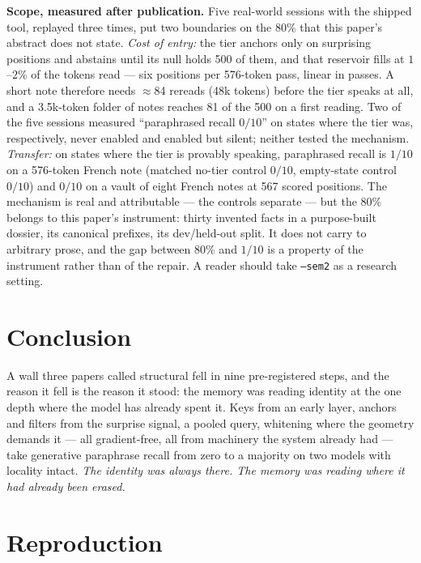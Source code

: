 \documentclass[11pt]{article}
\begin{document}
\textbf{Scope, measured after publication.} Five real-world sessions with the shipped tool, replayed three times, put two boundaries on the $80\%$ that this paper's abstract does not state. \emph{Cost of entry:} the tier anchors only on surprising positions and abstains until its null holds 500 of them, and that reservoir fills at $1$--$2\%$ of the tokens read --- six positions per 576-token pass, linear in passes. A short note therefore needs $\approx$84 rereads (48k tokens) before the tier speaks at all, and a 3.5k-token folder of notes reaches 81 of the 500 on a first reading. Two of the five sessions measured ``paraphrased recall $0/10$'' on states where the tier was, respectively, never enabled and enabled but silent; neither tested the mechanism. \emph{Transfer:} on states where the tier is provably speaking, paraphrased recall is $1/10$ on a 576-token French note (matched no-tier control $0/10$, empty-state control $0/10$) and $0/10$ on a vault of eight French notes at 567 scored positions. The mechanism is real and attributable --- the controls separate --- but the $80\%$ belongs to this paper's instrument: thirty invented facts in a purpose-built dossier, its canonical prefixes, its dev/held-out split. It does not carry to arbitrary prose, and the gap between $80\%$ and $1/10$ is a property of the instrument rather than of the repair. A reader should take \texttt{--sem2} as a research setting.

\section{Conclusion}

A wall three papers called structural fell in nine pre-registered steps, and the reason it fell is the reason it stood: the memory was reading identity at the one depth where the model has already spent it. Keys from an early layer, anchors and filters from the surprise signal, a pooled query, whitening where the geometry demands it --- all gradient-free, all from machinery the system already had --- take generative paraphrase recall from zero to a majority on two models with locality intact. \emph{The identity was always there. The memory was reading where it had already been erased.}

\appendix

\section{Reproduction}
\end{document}
